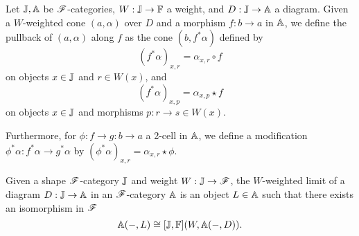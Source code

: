 \documentclass[../thesis.tex]{subfiles}
\begin{document}
  \begin{definition}
    Let ${\mathbb{J}}, {\mathbb{A}}$ be ${\mathscr{F}}$-categories, $W : {\mathbb{J}} \to {\mathbb{F}}$ a weight, and $D : {\mathbb{J}} \to {\mathbb{A}}$ a diagram.
    Given a $W$-weighted cone $(a,\alpha)$ over $D$ and a morphism $f : b \to a$ in ${\mathbb{A}}$, we define
    the pullback of $(a,\alpha)$ along $f$ as the cone $(b,f^*\alpha)$ defined by
    \[(f^*\alpha)_{x,r} = \alpha_{x,r} \circ f\]
    on objects $x \in {\mathbb{J}}$ and $r \in W(x)$, and
    \[(f^*\alpha)_{x,p} = \alpha_{x,p} \star f\]
    on objects $x \in {\mathbb{J}}$ and morphisms $p : r \to s \in W(x)$.


    Furthermore, for $\phi : f \to g : b \to a$ a 2-cell in ${\mathbb{A}}$, we define a modification $\phi^*\alpha :
    f^*\alpha \to g^*\alpha$ by \((\phi^*\alpha)_{x,r} = \alpha_{x,r} \star \phi\).
  \end{definition}

  \begin{definition}
    Given a shape ${\mathscr{F}}$-category ${\mathbb{J}}$ and weight $W : {\mathbb{J}} \to {\mathscr{F}}$, the $W$-weighted limit of a diagram
    $D : {\mathbb{J}} \to {\mathbb{A}}$ in an ${\mathscr{F}}$-category ${\mathbb{A}}$ is an object $L \in {\mathbb{A}}$ such that there exists an
    isomorphism in ${\mathscr{F}}$
    \[{\mathbb{A}}(-,L) \cong [{\mathbb{J}},{\mathbb{F}}](W,{\mathbb{A}}(-,D)).\]
  \end{definition}
\end{document}
